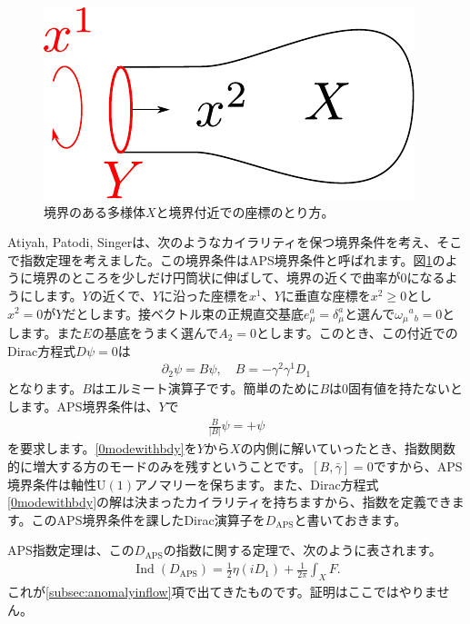 \documentclass[paper=a4, fontsize=12pt, line_length=16cm, number_of_lines=33,dvipdfmx]{jlreq}
\numberwithin{equation}{section}
\newcommand{\del}{\partial}
\newcommand{\gammab}{\bar{\gamma}}
\newcommand{\U}{\mathrm{U}}
\DeclareMathOperator{\Ind}{\mathrm{Ind}}
\newcommand{\DAPS}{D_{\mathrm{APS}}}
\begin{document}
\begin{figure}[htbp]
  \centering
  \includegraphics{APSbdy.pdf}
  \caption{境界のある多様体$X$と境界付近での座標のとり方。}
  \label{fig:APSbdy}
\end{figure}
Atiyah, Patodi, Singer\cite{Atiyah:1975jf,Atiyah:1976jg,Atiyah:1980jh}は、次のようなカイラリティを保つ境界条件を考え、そこで指数定理を考えました。この境界条件はAPS境界条件と呼ばれます。図\ref{fig:APSbdy}のように境界のところを少しだけ円筒状に伸ばして、境界の近くで曲率が$0$になるようにします。$Y$の近くで、$Y$に沿った座標を$x^1$、$Y$に垂直な座標を$x^2\ge 0$とし$x^2=0$が$Y$だとします。接ベクトル束の正規直交基底$e^a_{\mu}=\delta^{a}_{\mu}$と選んで$\omega_{\mu}{}^{a}{}_{b}=0$とします。また$E$の基底をうまく選んで$A_2=0$とします。このとき、この付近でのDirac方程式$D\psi=0$は
\begin{align}
  \del_{2}\psi=B\psi,\quad B=-\gamma^{2}\gamma^{1}D_{1}
  \label{0modewithbdy}
\end{align}
となります。$B$はエルミート演算子です。簡単のために$B$は$0$固有値を持たないとします。APS境界条件は、$Y$で
\begin{align}
  \frac{B}{|B|}\psi=+\psi\label{2dAPSbc}
\end{align}
を要求します。\eqref{0modewithbdy}を$Y$から$X$の内側に解いていったとき、指数関数的に増大する方のモードのみを残すということです。$[B,\gammab]=0$ですから、APS境界条件は軸性$\U(1)$アノマリーを保ちます。また、Dirac方程式\eqref{0modewithbdy}の解は決まったカイラリティを持ちますから、指数を定義できます。このAPS境界条件を課したDirac演算子を$\DAPS$と書いておきます。

APS指数定理は、この$\DAPS$の指数に関する定理で、次のように表されます。
\begin{align}
  \Ind(\DAPS)=\frac12 \eta(iD_1)+\frac{1}{2\pi}\int_{X}F.\label{2dAPSindextheorem}
\end{align}
これが\ref{subsec:anomalyinflow}項で出てきたものです。証明はここではやりません。
\end{document}
